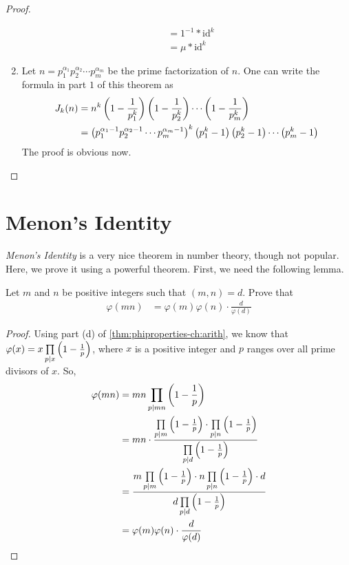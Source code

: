 \begin{proof}
\begin{enumerate}
\begin{align*}
						&= 1^{-1} \ast \text{id}^k\\
						&= \mu \ast \text{id}^k
				\end{align*}
			\item Let $n = p_1^{\alpha_1}p_2^{\alpha_2} \cdots p_m^{\alpha_m}$ be the prime factorization of $n$. One can write the formula in part $1$ of this theorem as
				\begin{align*}
					J_k(n) &= n^k \left(1 - \frac{1}{p_1^k}\right) \left(1 - \frac{1}{p_2^k}\right)\cdots \left(1 - \frac{1}{p_m^k}\right)\\
			   &= \left(p_1^{\alpha_1- 1}p_2^{\alpha_2 -1 } \cdots p_m^{\alpha_m -1 }\right)^k \left(p_1^k -1\right) \left(p_2^k -1\right) \cdots \left(p_m^k -1\right)
				\end{align*}
			The proof is obvious now.
		\end{enumerate}
	\end{proof}


\section{Menon's Identity}
\textit{Menon's Identity} is a very nice theorem in number theory, though not popular. Here, we prove it using a powerful theorem. First, we need the following lemma.
	\begin{lemma}\label{lem:phigcd}
		Let $m$ and $n$ be positive integers such that $(m,n)=d$. Prove that
			\begin{align*}
				\varphi (mn)
					& = \varphi (m) \varphi (n) \cdot \frac{d}{\varphi (d)}
			\end{align*}
	\end{lemma}

	\begin{proof}
		Using part (d) of \autoref{thm:phiproperties-ch:arith}, we know that $\varphi(x) = x \prod\limits_{p\mid x} \left(1 - \frac{1}{p}\right)$, where $x$ is a positive integer and $p$ ranges over all prime divisors of $x$. So,
			\begin{align*}
				\varphi(mn) &= mn \prod\limits_{p \mid mn}\left(1 - \frac 1p\right)\\
							&= mn \cdot\frac{\prod\limits_{p \mid m}\left(1 - \frac 1p\right) \cdot \prod\limits_{p \mid n}\left(1 - \frac 1p\right)}{\prod\limits_{p \mid d}\left(1 - \frac 1p\right)}\\
							&= \frac{m\prod\limits_{p \mid m}\left(1 - \frac 1p\right) \cdot n \prod\limits_{p \mid n}\left(1 - \frac 1p\right) \cdot d}{d\prod\limits_{p \mid d}\left(1 - \frac 1p\right)}\\
							&= \varphi(m)\varphi(n) \cdot \frac{d}{\varphi(d)}
			\end{align*}
	\end{proof}


